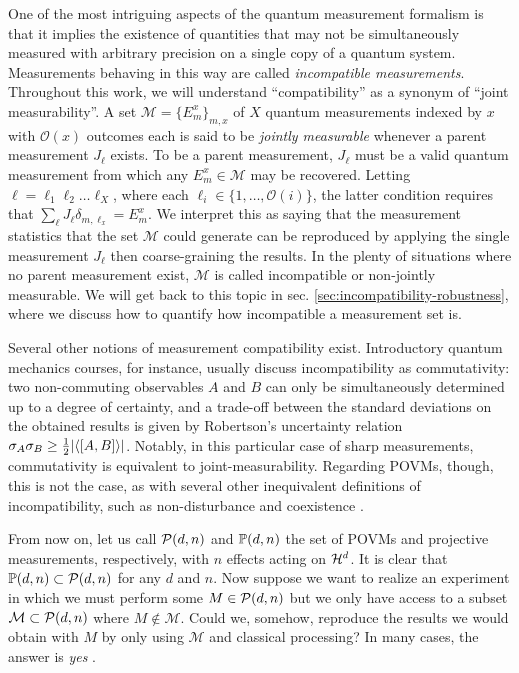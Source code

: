 		One of the most intriguing aspects of the quantum measurement formalism is that it implies the existence of quantities that may not be simultaneously measured with arbitrary precision on a single copy of a quantum system. Measurements behaving in this way are called \emph{incompatible measurements}. Throughout this work, we will understand ``compatibility'' as a synonym of ``joint measurability''. A set $\mathcal{M} = \{E_m^x \}_{m, x}$ of $X$ quantum measurements indexed by $x$ with $\mathcal{O}(x)$ outcomes each is said to be \emph{jointly measurable} whenever a parent measurement $J_\ell$ exists. To be a parent measurement, $J_\ell$ must be a valid quantum measurement from which any $E_m^x \in \mathcal{M}$ may be recovered. Letting $\ell = \ell_1\ell_2\ldots\ell_X$, where each $\ell_i \in \{ 1, \ldots, \mathcal{O}(i) \}$, the latter condition requires that $\sum_\ell J_\ell \delta_{m, \ell_x} = E_m^x$. We interpret this as saying that the measurement statistics that the set $\mathcal{M}$ could generate can be reproduced by applying the single measurement $J_\ell$ then coarse-graining the results. In the plenty of situations where no parent measurement exist, $\mathcal{M}$ is called incompatible or non-jointly measurable. We will get back to this topic in sec. \ref{sec:incompatibility-robustness}, where we discuss how to quantify how incompatible a measurement set is.
		
		Several other notions of measurement compatibility exist. Introductory quantum mechanics courses, for instance, usually discuss incompatibility as commutativity: two non-commuting observables $A$ and $B$ can only be simultaneously determined up to a degree of certainty, and a trade-off between the standard deviations on the obtained results is given by Robertson's uncertainty relation $\sigma_A \sigma_B \geq \frac{1}{2} \abs{ \langle \left[ A, B \right] \rangle }$. Notably, in this particular case of sharp measurements, commutativity is equivalent to joint-measurability. Regarding POVMs, though, this is not the case, as with several other inequivalent definitions of incompatibility, such as non-disturbance and coexistence \cite{heinosaari_2016_incompatible}.
		
		From now on, let us call $\mathcal{P}(d,n)$ and $\mathbb{P}(d,n)$ the set of POVMs and projective measurements, respectively, with $n$ effects acting on $\mathcal{H}^{d}$. It is clear that $\mathbb{P}(d,n) \subset \mathcal{P}(d,n)$ for any $d$ and $n$. Now suppose we want to realize an experiment in which we must perform some $M \in \mathcal{P}(d,n)$ but we only have access to a subset $\mathcal{M} \subset \mathcal{P}(d,n)$ where $M \notin \mathcal{M}$. Could we, somehow, reproduce the results we would obtain with $M$ by only using $\mathcal{M}$ and classical processing? In many cases, the answer is \emph{yes} \cite{guerini_tese,guerini_2017_measurementsimulability,haapasalo_2012_measurementsmixing}.
		
